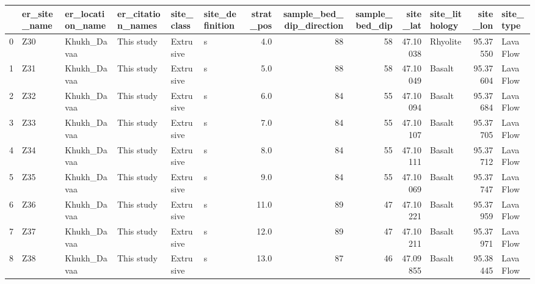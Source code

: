 \documentclass[11pt]{article}
\begin{document}
    \begin{sidewaystable}
    {\tiny\begin{tabular}{llllllrrrrlrl}
\toprule
{} & er\_site\_name & er\_location\_name & er\_citation\_names & site\_class & site\_definition &  strat\_pos &  sample\_bed\_dip\_direction &  sample\_bed\_dip &  site\_lat & site\_lithology &  site\_lon &  site\_type \\
\midrule
0  &          Z30 &      Khukh\_Davaa &        This study &  Extrusive &               s &        4.0 &                        88 &              58 &  47.10038 &       Rhyolite &  95.37550 &  Lava Flow \\
1  &          Z31 &      Khukh\_Davaa &        This study &  Extrusive &               s &        5.0 &                        88 &              58 &  47.10049 &         Basalt &  95.37604 &  Lava Flow \\
2  &          Z32 &      Khukh\_Davaa &        This study &  Extrusive &               s &        6.0 &                        84 &              55 &  47.10094 &         Basalt &  95.37684 &  Lava Flow \\
3  &          Z33 &      Khukh\_Davaa &        This study &  Extrusive &               s &        7.0 &                        84 &              55 &  47.10107 &         Basalt &  95.37705 &  Lava Flow \\
4  &          Z34 &      Khukh\_Davaa &        This study &  Extrusive &               s &        8.0 &                        84 &              55 &  47.10111 &         Basalt &  95.37712 &  Lava Flow \\
5  &          Z35 &      Khukh\_Davaa &        This study &  Extrusive &               s &        9.0 &                        84 &              55 &  47.10069 &         Basalt &  95.37747 &  Lava Flow \\
6  &          Z36 &      Khukh\_Davaa &        This study &  Extrusive &               s &       11.0 &                        89 &              47 &  47.10221 &         Basalt &  95.37959 &  Lava Flow \\
7  &          Z37 &      Khukh\_Davaa &        This study &  Extrusive &               s &       12.0 &                        89 &              47 &  47.10211 &         Basalt &  95.37971 &  Lava Flow \\
8  &          Z38 &      Khukh\_Davaa &        This study &  Extrusive &               s &       13.0 &                        87 &              46 &  47.09855 &         Basalt &  95.38445 &  Lava Flow \\

\end{tabular}}
\end{sidewaystable}
\end{document}
